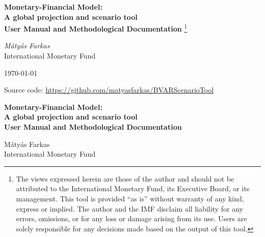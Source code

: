 \documentclass[11pt]{article}
\theoremstyle{definition}
\theoremstyle{remark}
\begin{document}
\begin{titlepage}
\vspace*{3cm}
\begin{center}
{\LARGE\bfseries Monetary-Financial Model:\\[2pt] A global projection and scenario tool}\\[6pt]
{\LARGE\bfseries User Manual and Methodological Documentation}%
\footnote{The views expressed herein are those of the author and should
not be attributed to the International Monetary Fund, its Executive
Board, or its management.  This tool is provided ``as is'' without
warranty of any kind, express or implied.  The author and the IMF
disclaim all liability for any errors, omissions, or for any loss or
damage arising from its use.  Users are solely responsible for any
decisions made based on the output of this tool.}

\vspace{1.2cm}

{\large\itshape M\'aty\'as Farkas}\\[4pt]
International Monetary Fund

\vspace{1.5cm}

\today

\vspace{1.5cm}

Source code: \url{https://github.com/matyasfarkas/BVARScenarioTool}

\end{center}

\vfill
\end{titlepage}


\begin{center}
{\LARGE\bfseries Monetary-Financial Model:\\[2pt] A global projection and scenario tool}\\[6pt]
{\LARGE\bfseries User Manual and Methodological Documentation}
\end{center}

\vspace{0.8cm}

\begin{center}
\begin{minipage}{0.45\textwidth}\centering
M\'aty\'as Farkas\\
International Monetary Fund
\end{minipage}
\end{center}
\end{document}
